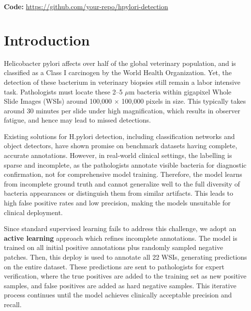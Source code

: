 \documentclass[conference]{IEEEtran}
\begin{document}
\maketitle

\vspace{-0.5em}
\textbf{Code:} \url{https://github.com/your-repo/hpylori-detection}

\section{Introduction}

Helicobacter pylori affects over half of the global veterinary population, and is classified as a Class I carcinogen by the World Health Organization. Yet, the detection of these bacterium in veterinary biopsies still remain a labor intensive task. Pathologists must locate these 2--5 $\mu$m bacteria within gigapixel Whole Slide Images (WSIs) around 100,000 $\times$ 100,000 pixels in size. This typically takes around 30 minutes per slide under high magnification, which results in observer fatigue, and hence may lead to missed detections.

Existing solutions for H.pylori detection, including classification networks and object detectors, have shown promise on benchmark datasets having complete, accurate annotations. However, in real-world clinical settings, the labelling is sparse and incomplete, as the pathologists annotate visible bacteria for diagnostic confirmation, not for comprehensive model training. Therefore, the model learns from incomplete ground truth and cannot generalize well to the full diversity of bacteria appearances or distinguish them from similar artifacts. This leads to high false positive rates and low precision, making the models unsuitable for clinical deployment.

Since standard supervised learning fails to address this challenge, we adopt an \textbf{active learning} approach which refines incomplete annotations. The model is trained on all initial positive annotations plus randomly sampled negative patches. Then, this deploy is used to annotate all 22 WSIs, generating predictions on the entire dataset. These predictions are sent to pathologists for expert verification, where the true positives are added to the training set as new positive samples, and false positives are added as hard negative samples. This iterative process continues until the model achieves clinically acceptable precision and recall.
\end{document}
